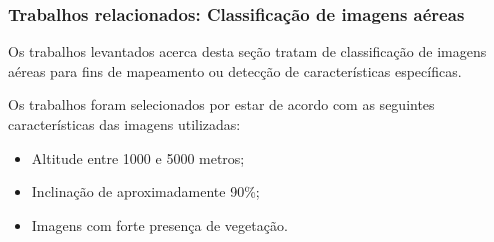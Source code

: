 \documentclass[t]{beamer}
\begin{document}
%

\begin{frame}
	\frametitle{Trabalhos relacionados: Classificação de imagens aéreas}

	Os trabalhos levantados acerca desta seção tratam de classificação de imagens aéreas para fins de mapeamento ou detecção de características específicas. 
	
	\vspace{0.5cm}

	Os trabalhos foram selecionados por estar de acordo com as seguintes características das imagens utilizadas:

	\begin{itemize}
		\item Altitude entre 1000 e 5000 metros;
		\item Inclinação de aproximadamente 90\%;
		\item Imagens com forte presença de vegetação.
	\end{itemize}



\end{frame}
\end{document}
